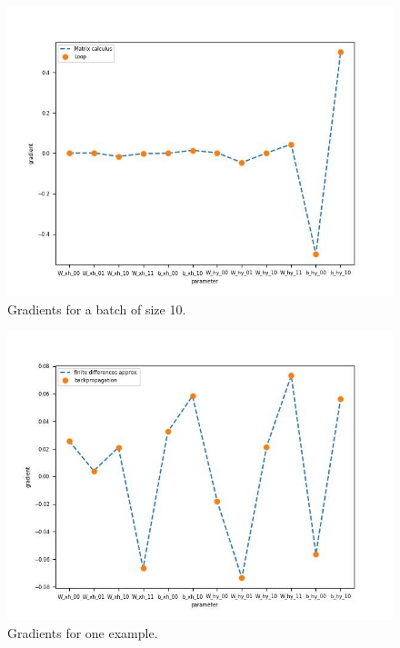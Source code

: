 \documentclass[11pt,english]{article}
\begin{document}
\begin{figure}
	\includegraphics[width=\linewidth]{pic2.jpg}
	\caption{Gradients for a batch of size 10.}
	\label{fig:boat1}
\end{figure}


\begin{figure}
	\includegraphics[width=\linewidth]{pic3.jpg}
	\caption{Gradients for one example.}
	\label{fig:boat1}
\end{figure}
\end{document}
